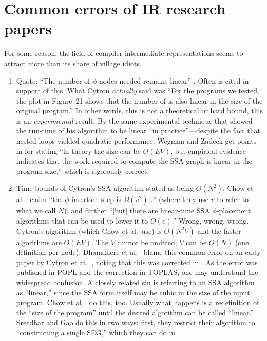 \documentclass[12pt,titlepage,twoside]{article}
\let\oldsection\section
\renewcommand{\section}{\setcounter{figure}{0}\setcounter{table}{0}\oldsection}
\begin{document}
\section{Common errors of IR research papers}
For some reason, the field of compiler intermediate representations
seems to attract more than its share of village idiots.
\begin{enumerate}
\item Quote: ``The number of $\phi$-nodes needed remains linear''
\cite{sreedhar95:lintime}.  Often \cite{cytron91:ssa} is cited in
support of this.  What Cytron \emph{actually} said was ``For the
programs we tested, the plot in Figure~21 shows that the number of
 is also linear in the size of the original program.''
In other words, this is not a theoretical or hard bound, this is an
\emph{experimental} result.  By the same experimental technique that
showed the run-time of his algorithm to be linear ``in
practice''---despite the fact that nested  loops
yielded quadratic performance.  Wegman and Zadeck get points in
\cite{wegman91:scc} for stating ``in theory the size can be $O(EV)$,
but empirical evidence indicates that the work required to compute the
SSA graph is linear in the program size,'' which is rigorously correct.
\item Time bounds of Cytron's SSA algorithm stated as being $O(N^2)$.
Chow et al.\ \cite{chow97:ssapre} claim ``the $\phi$-insertion step is
$\Omega(v^2)$\ldots'' (where they use $v$ to refer to what we call
$N$), and further ``[but] there are linear-time SSA $\phi$-placement
algorithms that can be used to lower it to $O(e)$.''  Wrong, wrong,
wrong.  Cytron's algorithm (which Chow et al.\ use) is $O(N^2 V)$ and
the faster algorithms are $O(EV)$.  The $V$ cannot be omitted; $V$ can
be $O(N)$ (one definition per node).  Dhamdhere et al.\
\cite{dhamdhere92:large} blame this common error on an early paper by
Cytron et at.\ \cite{cytron89:ssa}, noting that this was corrected in
\cite{cytron91:ssa}.  As the error was published in POPL and the
correction in TOPLAS, one may understand the widespread confusion.  A
closely related sin is referring to an SSA algorithm as ``linear,''
since the SSA form itself may be cubic in the size of the input
program.  Chow et al.\ \cite{chow97:ssapre} do this, too.  Usually
what happens is a redefinition of the ``size of the program'' until
the desired algorithm can be called ``linear.''  Sreedhar and Gao
\cite{sreedhar95:lintime} do this in two ways: first, they restrict
their algorithm to ``constructing a single SEG,'' which they can do in

\end{enumerate}
\end{document}
